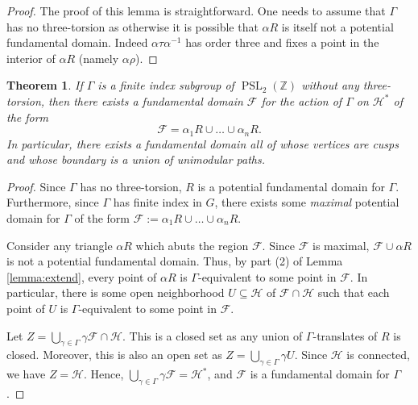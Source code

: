 \documentclass{amsart}
\theoremstyle{plain}
\newtheorem{thm}{Theorem}[section]
\theoremstyle{definition}
\newcommand{\F}{{\mathcal F}}
\renewcommand{\H}{\mathcal H}
\newcommand{\Z}{{\mathbb Z}}
\DeclareMathOperator{\PSL}{PSL}
\begin{document}
\begin{proof}
The proof of this lemma is straightforward.  One needs to assume that $\Gamma$ has no three-torsion as otherwise it is possible that $\alpha R$ is itself not a potential fundamental domain.  Indeed $\alpha \tau \alpha^{-1}$ has order three and fixes a point in the interior of $\alpha R$ (namely $\alpha \rho$).
\end{proof}

\begin{thm}
\label{thm:fd} If $\Gamma$ is a finite index subgroup of
$\PSL_2(\Z)$ without any three-torsion, then there exists a
fundamental domain $\F$ for the action of $\Gamma $ on $\H^*$ of
the form
$$
\F = \alpha_1 R \cup \dots \cup \alpha_n R.
$$
In particular, there exists a fundamental domain all of whose
vertices are cusps and whose boundary is a union of unimodular
paths.
\end{thm}

\begin{proof}
Since $\Gamma$ has no three-torsion, $R$ is a potential fundamental domain for $\Gamma$. Furthermore, since $\Gamma$ has finite index in $G$, there exists some {\it maximal} potential domain for $\Gamma$ of the form $\F := \alpha_1 R \cup \dots \cup \alpha_n R$.

Consider any triangle $\alpha R$ which abuts the region $\F$.
Since $\F$ is maximal, $\F \cup \alpha R$ is not a potential fundamental
domain.  Thus, by part (2) of Lemma \ref{lemma:extend}, every
point of $\alpha R$ is $\Gamma$-equivalent to some point in $\F$.
In particular, there is some open neighborhood $U \subseteq \H$ of
$\F \cap \H$ such that each point of $U$ is $\Gamma$-equivalent to
some point in $\F$.

Let $Z = \bigcup_{\gamma \in \Gamma} \gamma \F \cap \H$.  This is a closed set as any union of $\Gamma$-translates of $R$ is closed.  Moreover, this is also an open set as  $Z = \bigcup_{\gamma \in \Gamma} \gamma U$.  Since $\H$ is connected, we have $Z = \H$.  Hence, $\bigcup_{\gamma \in \Gamma} \gamma \F = \H^*$, and $\F$ is a fundamental domain for $\Gamma$.
\end{proof}
\end{document}

